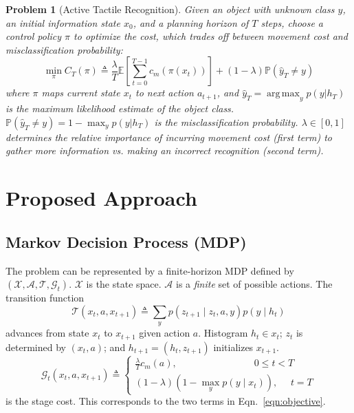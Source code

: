\documentclass[letterpaper, 10 pt, conference]{ieeeconf}  %
\DeclareMathOperator*{\argmax}{arg\,max}
\newtheorem*{problem*}{Problem}
\begin{document}
\begin{problem*}[Active Tactile Recognition]
Given an object with unknown class $y$, an initial information state $x_0$, and a planning horizon of $T$ steps, choose a control policy $\pi$ to optimize the cost, which trades off between movement cost and misclassification probability:
\begin{equation} \label{eqn:objective}
\min_\pi C_T(\pi) \triangleq \frac{\lambda}{T} \mathbb{E}\!\left[ \sum_{t=0}^{T-1} c_m(\pi(x_t)) \right]\!\! +\! (1\!-\!\lambda) \mathbb{P}(\hat{y}_T \!\neq y)
\end{equation}
where $\pi$ maps current state $x_t$ to next action $a_{t+1}$, and $\hat{y}_T \!=\! \argmax_y p(y | h_T)$ is the maximum likelihood estimate of the object class.
$\mathbb{P} (\hat{y}_T \!\!\neq\!\! y) \!\!=\!\! 1 \!\!-\! \max_y p(y | h_T)$ is the misclassification probability.
$\lambda \!\!\in\!\! [0,1]$ determines the relative importance
of incurring movement cost (first term) to gather more information vs. making an incorrect recognition (second term).
\end{problem*}




\section{Proposed Approach}
\label{sec:approach}

\subsection{Markov Decision Process (MDP)}
\label{sec:mdp}
The problem can be represented by a finite-horizon MDP defined by $(\mathcal{X},\mathcal{A},\mathcal{T},\mathcal{G}_t)$.
$\mathcal{X}$ is the state space.
$\mathcal{A}$ is a \textit{finite} set of possible actions.
The transition function
\[\mathcal{T}(x_t,a,x_{t+1}) \triangleq \sum_y p(z_{t+1} \mid z_t,a,y) p(y \mid h_t)\]
advances from state $x_t$ to $x_{t+1}$ given action $a$. Histogram $h_t \in x_t$; $z_t$ is determined by $(x_t, a)$; and $h_{t+1} = (h_t, z_{t+1})$ initializes $x_{t+1}$.
\[ 
\mathcal{G}_t(x_t,a,x_{t+1}) \triangleq \begin{cases}
\frac{\lambda}{T} c_m(a), \qquad \qquad \qquad \qquad 0\leq t < T\\
(1-\lambda)(1-\max_y p(y\mid x_t)), \quad \, \, t = T
\end{cases}
\]
is the stage cost. This corresponds to the two terms in Eqn.~\ref{eqn:objective}. %
\end{document}
